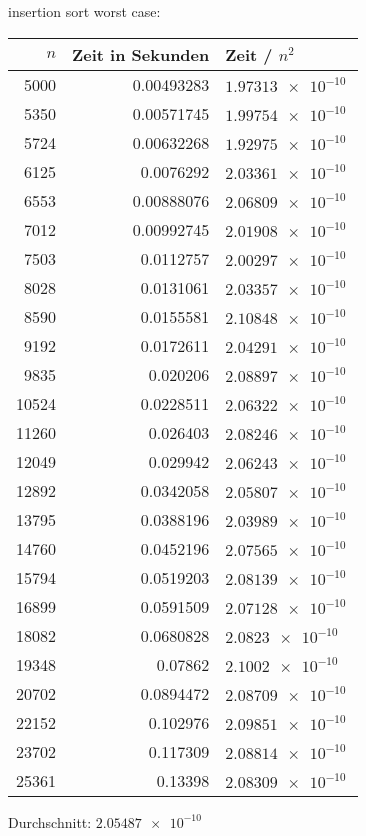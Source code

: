 \documentclass[a4paper]{scrartcl}
\begin{document}
\begin{itemize}
insertion sort worst case:
\begin{center}
\begin{tabular}{rrl}
$n$ & Zeit in Sekunden & Zeit / $n^2$\\
\hline
5000 & 0.00493283 & $\SI{1.97313e-10}{}$\\
5350 & 0.00571745 & $\SI{1.99754e-10}{}$\\
5724 & 0.00632268 & $\SI{1.92975e-10}{}$\\
6125 & 0.0076292 & $\SI{2.03361e-10}{}$\\
6553 & 0.00888076 & $\SI{2.06809e-10}{}$\\
7012 & 0.00992745 & $\SI{2.01908e-10}{}$\\
7503 & 0.0112757 & $\SI{2.00297e-10}{}$\\
8028 & 0.0131061 & $\SI{2.03357e-10}{}$\\
8590 & 0.0155581 & $\SI{2.10848e-10}{}$\\
9192 & 0.0172611 & $\SI{2.04291e-10}{}$\\
9835 & 0.020206 & $\SI{2.08897e-10}{}$\\
10524 & 0.0228511 & $\SI{2.06322e-10}{}$\\
11260 & 0.026403 & $\SI{2.08246e-10}{}$\\
12049 & 0.029942 & $\SI{2.06243e-10}{}$\\
12892 & 0.0342058 & $\SI{2.05807e-10}{}$\\
13795 & 0.0388196 & $\SI{2.03989e-10}{}$\\
14760 & 0.0452196 & $\SI{2.07565e-10}{}$\\
15794 & 0.0519203 & $\SI{2.08139e-10}{}$\\
16899 & 0.0591509 & $\SI{2.07128e-10}{}$\\
18082 & 0.0680828 & $\SI{2.0823e-10}{}$\\
19348 & 0.07862 & $\SI{2.1002e-10}{}$\\
20702 & 0.0894472 & $\SI{2.08709e-10}{}$\\
22152 & 0.102976 & $\SI{2.09851e-10}{}$\\
23702 & 0.117309 & $\SI{2.08814e-10}{}$\\
25361 & 0.13398 & $\SI{2.08309e-10}{}$\\
\end{tabular}
\end{center}
Durchschnitt: $\SI{2.05487e-10}{}$


\end{itemize}
\end{document}

